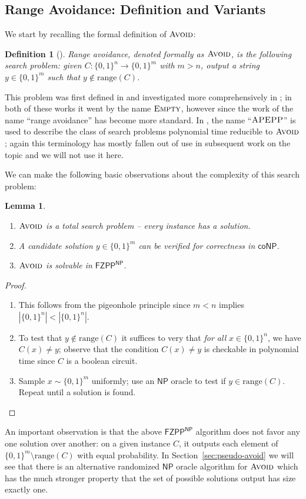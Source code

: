 \documentclass[11pt]{article}
\newtheorem{lemma}{Lemma}
\newtheorem{definition}{Definition}
\newcommand{\B}{\{0,1\}}
\newcommand{\avoid}{\textsc{Avoid}}
\begin{document}
\subsection{Range Avoidance: Definition and Variants}\label{sec:avoid-basics}
We start by recalling the formal definition of $\avoid$:

\begin{definition}[\cite{total}]
Range avoidance, denoted formally as $\avoid$, is the following search problem: given $C: \B^n \to \B^m$ with $m > n$, output a string $y \in \B^m$ such that $y \notin \mathrm{range}(C)$.
\end{definition}

This problem was first defined in \cite{total} and investigated more comprehensively in \cite{Korten1}; in both of these works it went by the name $\textsc{Empty}$, however since the work of \cite{RSW} the name ``range avoidance'' has become more standard. In \cite{total,Korten1}, the name ``$\textsc{APEPP}$'' is used to describe the class of search problems polynomial time reducible to $\avoid$; again this terminology has mostly fallen out of use in subsequent work on the topic and we will not use it here.

We can make the following basic observations about the complexity of this search problem:
\begin{lemma}
~
\begin{enumerate}
	\item $\avoid$ is a total search problem -- every instance has a solution.
	\item A candidate solution $y \in \B^m$ can be verified for correctness in $\mathsf{coNP}$.
	\item $\avoid$ is solvable in $\mathsf{FZPP^{NP}}$.
\end{enumerate}
\end{lemma}

\begin{proof}
~
\begin{enumerate}
	\item This follows from the pigeonhole principle since $m < n$ implies $|\B^n| < |\B^n|$.
	\item To test that $y \notin \mathrm{range}(C)$ it suffices to very that \emph{for all} $x \in \B^n$, we have $C(x) \neq y$; observe that the condition $C(x) \neq y$ is checkable in polynomial time since $C$ is a boolean circuit.
	\item Sample $x \sim \B^m$ uniformly; use an $\mathsf{NP}$ oracle to test if $y \in \mathrm{range}(C)$. Repeat until a solution is found.
\end{enumerate}

\end{proof}
An important observation is that the above $\mathsf{FZPP^{NP}}$ algorithm does not favor any one solution over another: on a given instance $C$, it outputs each element of $\B^m \setminus \mathrm{range}(C)$ with equal probability. In Section~\ref{sec:pseudo-avoid} we will see that there is an alternative randomized $\mathsf{NP}$ oracle algorithm for $\avoid$ which has the much stronger property that the set of possible solutions output has size exactly one.
\end{document}
